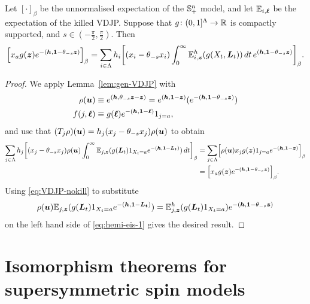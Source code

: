 \documentclass[11pt,a4paper]{article}
\begin{document}
\begin{theorem}
  \label{thm:EIS-VDJP}
  Let $[\cdot]_\beta$ be the unnormalised expectation of the
  ${\mathbb S}_+^n$ model, and let $\mathbb{E}_{i,\boldsymbol{\ell}}$ be the expectation of
  the killed VDJP.  Suppose that $g\colon(0,1]^{\Lambda}\to \mathbb{R}$ is
  compactly supported, and
  $s\in(-\frac{\pi}{2},\frac{\pi}{2})$. Then
  \begin{equation}
    \label{eq:EIS-VDJP-g}
    \uspin{x_{a}
      g(\V{z})e^{-(\V{h},\V{1}-\theta_{-s}\V{z})}}_{\beta} =
    \sum_{i\in\Lambda}h_{i}\uspin{(x_{i}-\theta_{-s}x_{i})
      \int_{0}^{\infty} \E_{i,\V{z}}^h(g(X_{t},\V{L}_{t}))\,dt\,e^{(\V{h},\V{1}-\theta_{-s}\V{z})}}_{\beta}.
  \end{equation}
\end{theorem}

\begin{proof}
  We apply Lemma~\ref{lem:gen-VDJP} with
  \begin{align}
      \rho(\boldsymbol{u})
      &\equiv e^{(\boldsymbol{h},\theta_{-s}\boldsymbol{z} - \boldsymbol{z})} = e^{(\boldsymbol{h},\boldsymbol{1}-\boldsymbol{z})}(e^{-(\boldsymbol{h},\boldsymbol{1}-\theta_{-s}\boldsymbol{z})})\\
      f(j,\boldsymbol{\ell}) &\equiv g(\boldsymbol{\ell})e^{-(\boldsymbol{h},\boldsymbol{1}-\boldsymbol{\ell})}
      1_{j=a},
  \end{align}
  and use that
  $(T_j\rho)(\boldsymbol{u}) = h_j(x_j - \theta_{-s}x_j) \rho(\boldsymbol{u})$ to obtain
  \begin{align}
    \nonumber
      \sum_{j\in\Lambda} h_j\uspin{(x_j - \theta_{-s}x_j)
        \rho(\V{u})\int_0^\infty \E_{j,\V{z}}(
        g(\V{L}_t)1_{X_{t}=a}e^{-(\V{h},\V{1}-\V{L_t})})\,dt}_{\beta}
      &= \sum_{j\in\Lambda}\uspin{\rho(\V{u})x_{j}
        g(\V{z})1_{j=a}e^{-(\V{h},\V{1}-\V{z})}}_{\beta}\\
\label{eq:hemi-eis-1}
      &= 
      \uspin{x_{a}
        g(\V{z})e^{-(\V{h},\V{1}-\theta_{-s}\V{z})}}_{\beta}.
  \end{align}
  Using \eqref{eq:VDJP-nokill} to substitute
  \begin{equation}
    \rho(\boldsymbol{u})\mathbb{E}_{j,\boldsymbol{z}}(
    g(\boldsymbol{L}_t)1_{X_{t}=a}e^{-(\boldsymbol{h},\boldsymbol{1}-\boldsymbol{L_t})}) 
    = \mathbb{E}_{j,\boldsymbol{z}}^h(
    g(\boldsymbol{L}_t)1_{X_{t}=a})e^{-(\boldsymbol{h},\boldsymbol{1}-\theta_{-s}\boldsymbol{z})}
  \end{equation}
  on the left hand side of \eqref{eq:hemi-eis-1} gives the desired
  result.
\end{proof}


\section{Isomorphism theorems for supersymmetric spin models}
\label{sec:SUSY}
\end{document}
